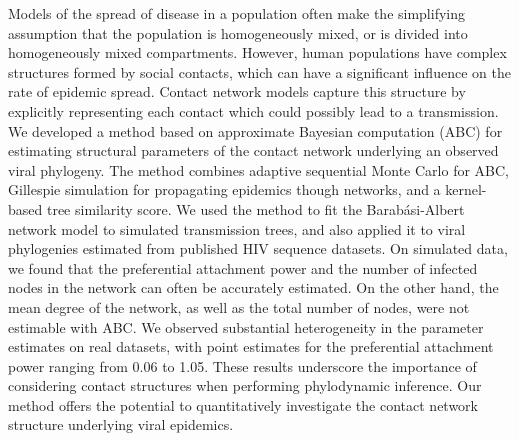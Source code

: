 Models of the spread of disease in a population often make the simplifying
assumption that the population is homogeneously mixed, or is divided into
homogeneously mixed compartments. However, human populations have complex
structures formed by social contacts, which can have a significant influence on
the rate of epidemic spread. Contact network models capture this structure by
explicitly representing each contact which could possibly lead to a
transmission. We developed a method based on approximate Bayesian
computation (ABC) for estimating structural parameters of the contact network
underlying an observed viral phylogeny. The method combines adaptive sequential
Monte Carlo for ABC, Gillespie simulation for propagating epidemics though
networks, and a kernel-based tree similarity score. We used the method to fit
the Barab\'{a}si-Albert network model to simulated transmission trees, and also
applied it to viral phylogenies estimated from  published
HIV sequence datasets. On simulated data, we found that the preferential
attachment power and the number of infected nodes in the network can often be
accurately estimated. On the other hand, the mean degree of the network, as
well as the total number of nodes, were not estimable with ABC. We observed
substantial heterogeneity in the parameter estimates on real datasets, with
point estimates for the preferential attachment power ranging from 0.06 to
1.05. These results underscore the importance of considering contact structures
when performing phylodynamic inference. Our method offers the potential to
quantitatively investigate the contact network structure underlying viral
epidemics.
